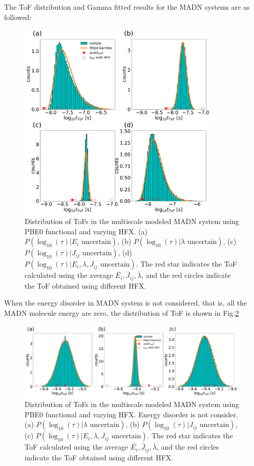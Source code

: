 \documentclass[letterpaper,12pt]{article}
\begin{document}
The ToF distribution and Gamma fitted results for the MADN systems are as followed:
\begin{figure}[H]
    \centering
    \includegraphics[width=0.85\textwidth]{figs/MADN_HFX/fig_mle_MADN_withE.pdf}
    \caption{Distribution of ToFs in the multiscale modeled MADN system using PBE0 functional and varying HFX. 
    (a) $P(\log_{10}(\tau)|E_i \text{ uncertain})$, 
    (b) $P(\log_{10}(\tau)|\lambda \text{ uncertain})$, 
    (c) $P(\log_{10}(\tau)|J_{ij} \text{ uncertain})$, 
    (d) $P(\log_{10}(\tau)|E_i, \lambda, J_{ij} \text{ uncertain})$. The red star indicates the ToF calculated using the average $\bar{E_i}, \bar{J}_{ij}, \bar{\lambda}$, and the red circles indicate the ToF obtained using different HFX.}
    \label{fig:mle_MADN_withE}
\end{figure}

When the energy disorder in MADN system is not considered, that is, all the MADN molecule energy are zero, the distribution of ToF is shown in Fig.\ref{fig:mle_MADN_noE}
\begin{figure}[H]
    \centering
    \includegraphics[width=0.99\textwidth]{figs/MADN_HFX/fig_mle_MADN_noE.pdf}
    \caption{Distribution of ToFs in the multiscale modeled MADN system using PBE0 functional and varying HFX. Energy disorder is not consider. 
    (a) $P(\log_{10}(\tau)|\lambda \text{ uncertain})$, 
    (b) $P(\log_{10}(\tau)|J_{ij} \text{ uncertain})$, 
    (c) $P(\log_{10}(\tau)|E_i, \lambda, J_{ij} \text{ uncertain})$. The red star indicates the ToF calculated using the average $\bar{E_i}, \bar{J}_{ij}, \bar{\lambda}$, and the red circles indicate the ToF obtained using different HFX.}
    \label{fig:mle_MADN_noE}
\end{figure}
\end{document}
